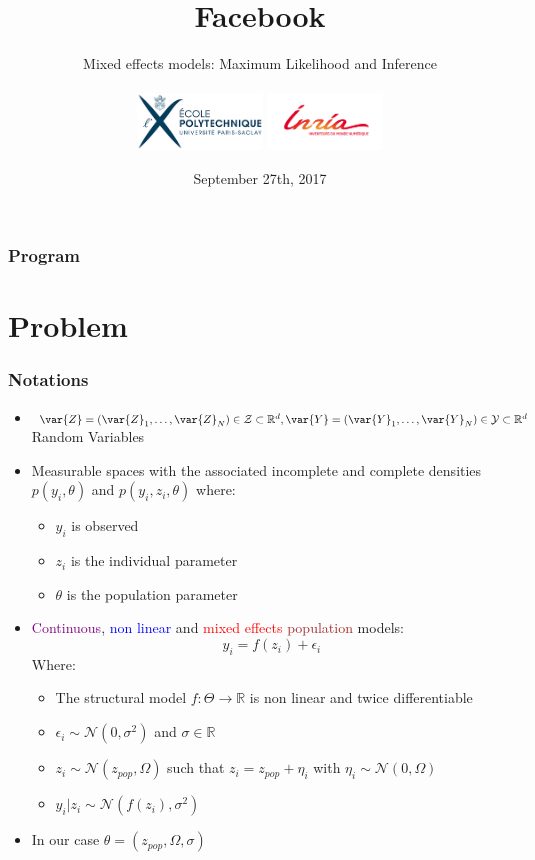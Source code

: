 \documentclass[xcolor={dvipsnames}]{beamer}
\title{Facebook}
\subtitle{Mixed effects models: Maximum Likelihood and Inference\\~\\
\includegraphics[height=1.5cm]{logo_x}
\includegraphics[height=1.5cm]{logo_inria}}
\institute[]{Belhal Karimi, Marc Lavielle, Eric Moulines}
\date{September 27th, 2017}
\begin{document}
\begin{frame}
\titlepage
\end{frame}

\begin{frame}
\frametitle{Program}
\tableofcontents
\end{frame}




\section{Problem}

\begin{frame}
\frametitle{Notations}

\begin{itemize}
\item $\var{Z} = (\var{Z}_1,\dots,\var{Z}_N) \in \mathcal{Z} \subset \mathbb{R}^d, \var{Y} = (\var{Y}_1,\dots,\var{Y}_N) \in \mathcal{Y} \subset \mathbb{R}^d$ Random Variables
\item Measurable spaces with the associated incomplete and complete densities $p(y_i,\theta)$ and $p(y_i,z_i,\theta)$ where:
\begin{itemize}
  \item $y_i$ is observed
  \item $z_i$ is the individual parameter
  \item $\theta$ is the population parameter
\end{itemize}
\item \textcolor{purple}{Continuous}, \textcolor{blue}{non linear} and \textcolor{red}{mixed effects} \textcolor{brown}{population} models:
\begin{equation}
y_{i} = f(z_{i}) + \epsilon_i
\end{equation}
Where:
\begin{itemize}
  \item The structural model $f: \Theta \to \mathbb{R}$ is non linear and twice differentiable
  \item $\epsilon_i \sim \mathcal{N}(0,\sigma^2)$ and $\sigma \in \mathbb{R}$
  \item $z_i \sim \mathcal{N}(z_{pop},\Omega)$ such that $z_i = z_{pop} + \eta_i$ with $\eta_i \sim \mathcal{N}(0,\Omega)$
  \item $y_i | z_i \sim \mathcal{N}(f(z_i),\sigma^2)$
\end{itemize}
\item In our case $\theta = (z_{pop}, \Omega, \sigma )$

\end{itemize}

\end{frame}
\end{document}
